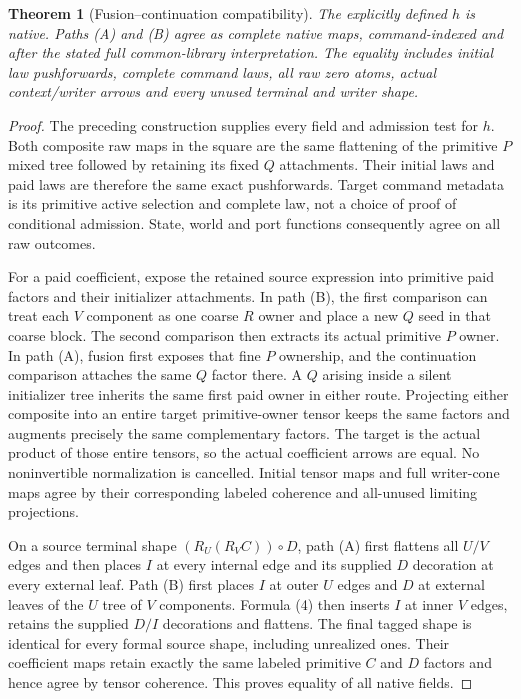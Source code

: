 \documentclass[11pt]{article}\usepackage{amsmath,amssymb,amsthm,geometry}\geometry{margin=1in}\newtheorem{theorem}{Theorem}
\begin{document}
\begin{theorem}[Fusion--continuation compatibility]
The explicitly defined $h$ is native. Paths (A) and (B) agree as complete native maps, command-indexed and after the stated full common-library interpretation. The equality includes initial law pushforwards, complete command laws, all raw zero atoms, actual context/writer arrows and every unused terminal and writer shape.
\end{theorem}
\begin{proof}
The preceding construction supplies every field and admission test for $h$. Both composite raw maps in the square are the same flattening of the primitive $P$ mixed tree followed by retaining its fixed $Q$ attachments. Their initial laws and paid laws are therefore the same exact pushforwards. Target command metadata is its primitive active selection and complete law, not a choice of proof of conditional admission. State, world and port functions consequently agree on all raw outcomes.

For a paid coefficient, expose the retained source expression into primitive paid factors and their initializer attachments. In path (B), the first comparison can treat each $V$ component as one coarse $R$ owner and place a new $Q$ seed in that coarse block. The second comparison then extracts its actual primitive $P$ owner. In path (A), fusion first exposes that fine $P$ ownership, and the continuation comparison attaches the same $Q$ factor there. A $Q$ arising inside a silent initializer tree inherits the same first paid owner in either route. Projecting either composite into an entire target primitive-owner tensor keeps the same factors and augments precisely the same complementary factors. The target is the actual product of those entire tensors, so the actual coefficient arrows are equal. No noninvertible normalization is cancelled. Initial tensor maps and full writer-cone maps agree by their corresponding labeled coherence and all-unused limiting projections.

On a source terminal shape $(R_U(R_VC))\circ D$, path (A) first flattens all $U/V$ edges and then places $I$ at every internal edge and its supplied $D$ decoration at every external leaf. Path (B) first places $I$ at outer $U$ edges and $D$ at external leaves of the $U$ tree of $V$ components. Formula (4) then inserts $I$ at inner $V$ edges, retains the supplied $D/I$ decorations and flattens. The final tagged shape is identical for every formal source shape, including unrealized ones. Their coefficient maps retain exactly the same labeled primitive $C$ and $D$ factors and hence agree by tensor coherence. This proves equality of all native fields.
\end{proof}
\end{document}
